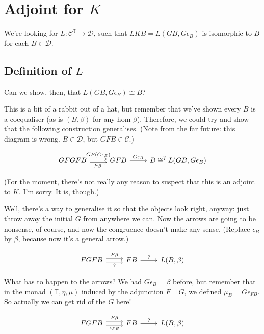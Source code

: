 \documentclass[11pt]{amsart}
\begin{document}
\section{Adjoint for \texorpdfstring{$K$}{K}}

We're looking for $L: \mathcal{C}^{\mathbb{T}} \to \mathcal{D}$, such that $LKB = L(GB, G \epsilon_B)$ is isomorphic to $B$ for each $B \in \mathcal{D}$.

\subsection{Definition of \texorpdfstring{$L$}{L}}

Can we show, then, that $L(GB, G \epsilon_B) \cong B$?

This is a bit of a rabbit out of a hat, but remember that we've shown every $B$ is a coequaliser (as is $(B, \beta)$ for any hom $\beta$).
Therefore, we could try and show that the following construction generalises.
(Note from the far future: this diagram is wrong. $B \in \mathcal{D}$, but $GFB \in \mathcal{C}$.)

\[
\begin{tikzcd}
GFGFB \arrow[r, shift left, "GF(G \epsilon_B)"] \arrow[r, shift right, "\mu_B"']
& GFB \arrow[r, "G \epsilon_B"]
& B \cong^{?} L(GB, G \epsilon_B)
\end{tikzcd}
\]

(For the moment, there's not really any reason to suspect that this is an adjoint to $K$. I'm sorry. It is, though.)

Well, there's a way to generalise it so that the objects look right, anyway: just throw away the initial $G$ from anywhere we can.
Now the arrows are going to be nonsense, of course, and now the congruence doesn't make any sense.
(Replace $\epsilon_B$ by $\beta$, because now it's a general arrow.)

\[
\begin{tikzcd}
FGFB \arrow[r, shift left, "F \beta"] \arrow[r, shift right, "?"']
& FB \arrow[r, "?"]
& L(B, \beta)
\end{tikzcd}
\]

What has to happen to the arrows?
We had $G \epsilon_B = \beta$ before, but remember that in the monad $(\mathbb{T}, \eta, \mu)$ induced by the adjunction $F \dashv G$, we defined $\mu_B = G \epsilon_{FB}$.
So actually we can get rid of the $G$ here!

\[
\begin{tikzcd}
FGFB \arrow[r, shift left, "F \beta"] \arrow[r, shift right, "\epsilon_{F B}"']
& FB \arrow[r, "?"]
& L(B, \beta)
\end{tikzcd}
\]
\end{document}
